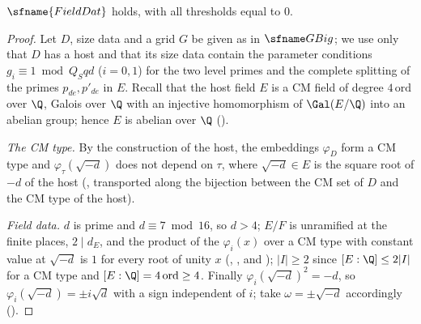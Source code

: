 \begin{proposition}\label{pf:sh-div:fielddat}
$\sfname{FieldDat}$ holds, with all thresholds equal to $0$.
\end{proposition}

\begin{proof}
Let $D$, size data and a grid $G$ be given as in $\shdivGBig$; we use only that $D$ has a host and that its size data contain
the parameter conditions $g_i\equiv1\bmod Q_Sqd$ ($i=0,1$) for the two level primes and the complete splitting of the primes
$p_{de},p'_{de}$ in $E$. Recall that the host field $E$ is a CM field of degree $4\,\mathrm{ord}$ over $\Q$, Galois over $\Q$ with an
injective homomorphism of $\Gal(E/\Q)$ into an abelian group; hence $E$ is abelian over $\Q$
().

\emph{The CM type.} By the construction of the host, the embeddings $\varphi_D$ form a CM type and $\varphi_\tau(\sqrt{-d})$ does not
depend on $\tau$, where $\sqrt{-d}\in E$ is the square root of $-d$ of the host
(, transported along the bijection between the CM set of $D$ and the CM type
of the host).

\emph{Field data.} $d$ is prime and $d\equiv7\bmod16$, so $d>4$; $E/F$ is unramified at the finite places, $2\mid d_E$, and the product
of the $\varphi_i(x)$ over a CM type with constant value at $\sqrt{-d}$ is $1$ for every root of unity $x$
(, , and );
$|I|\ge2$ since $[E:\Q]\le2|I|$ for a CM type and $[E:\Q]=4\,\mathrm{ord}\ge4$. Finally $\varphi_i(\sqrt{-d})^2=-d$, so
$\varphi_i(\sqrt{-d})=\pm i\sqrt d$ with a sign independent of $i$; take $\omega=\pm\sqrt{-d}$ accordingly
().


\end{proof}

